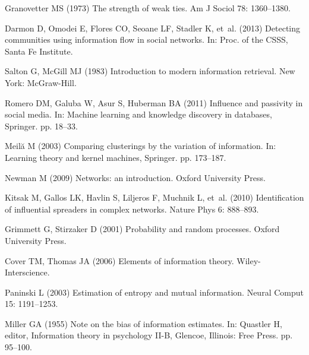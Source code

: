 \documentclass[10pt,letterpaper]{article}
\begin{document}
\begin{thebibliography}{10}
Granovetter MS (1973) The strength of weak ties.
\newblock Am J Sociol 78: 1360--1380.

Darmon D, Omodei E, Flores CO, Seoane LF, Stadler K, et~al. (2013) Detecting
  communities using information flow in social networks.
\newblock In: Proc. of the CSSS, Santa Fe Institute.

Salton G, {McGill} MJ (1983) Introduction to modern information retrieval.
\newblock New York: {McGraw-Hill}.

Romero DM, Galuba W, Asur S, Huberman BA (2011) Influence and passivity in
  social media.
\newblock In: Machine learning and knowledge discovery in databases, Springer.
  pp. 18--33.

Meil{\u{a}} M (2003) Comparing clusterings by the variation of information.
\newblock In: Learning theory and kernel machines, Springer. pp. 173--187.

Newman M (2009) Networks: an introduction.
\newblock Oxford University Press.

Kitsak M, Gallos LK, Havlin S, Liljeros F, Muchnik L, et~al. (2010)
  Identification of influential spreaders in complex networks.
\newblock Nature Phys 6: 888--893.

Grimmett G, Stirzaker D (2001) Probability and random processes.
\newblock Oxford University Press.

Cover TM, Thomas JA (2006) Elements of information theory.
\newblock Wiley-Interscience.

Paninski L (2003) Estimation of entropy and mutual information.
\newblock Neural Comput 15: 1191--1253.

Miller GA (1955) Note on the bias of information estimates.
\newblock In: Quastler H, editor, Information theory in psychology II-B,
  Glencoe, Illinois: Free Press. pp. 95--100.

\end{thebibliography}
\end{document}
